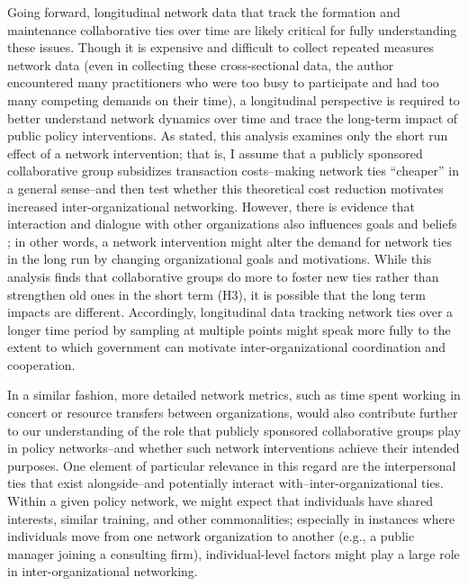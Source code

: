 \documentclass[12pt,a4paper,titlepage]{article}
\begin{document}
Going forward, longitudinal network data that track the formation and maintenance collaborative ties over time are likely critical for fully understanding these issues. Though it is expensive and difficult to collect repeated measures network data (even in collecting these cross-sectional data, the author encountered many practitioners who were too busy to participate and had too many competing demands on their time), a longitudinal perspective is required to better understand network dynamics over time and trace the long-term impact of public policy interventions. As stated, this analysis examines only the short run effect of a network intervention; that is, I assume that a publicly sponsored collaborative group subsidizes transaction costs--making network ties ``cheaper'' in a general sense--and then test whether this theoretical cost reduction motivates increased inter-organizational networking. However, there is evidence that interaction and dialogue with other organizations also influences goals and beliefs \parencite{bingham2008,innes2010,leach2005,lubell2005}; in other words, a network intervention might alter the demand for network ties in the long run by changing organizational goals and motivations. While this analysis finds that collaborative groups do more to foster new ties rather than strengthen old ones in the short term (H3), it is possible that the long term impacts are different. Accordingly, longitudinal data tracking network ties over a longer time period by sampling at multiple points might speak more fully to the extent to which government can motivate inter-organizational coordination and cooperation. 

In a similar fashion, more detailed network metrics, such as time spent working in concert or resource transfers between organizations, would also contribute further to our understanding of the role that publicly sponsored collaborative groups play in policy networks--and whether such network interventions achieve their intended purposes. One element of particular relevance in this regard are the interpersonal ties that exist alongside--and potentially interact with--inter-organizational ties. Within a given policy network, we might expect that individuals have shared interests, similar training, and other commonalities; especially in instances where individuals move from one network organization to another (e.g., a public manager joining a consulting firm), individual-level factors might play a large role in inter-organizational networking. 

\nocite{handcock2014-a,analytics2014,butts2014}

\printbibliography
\end{document}
